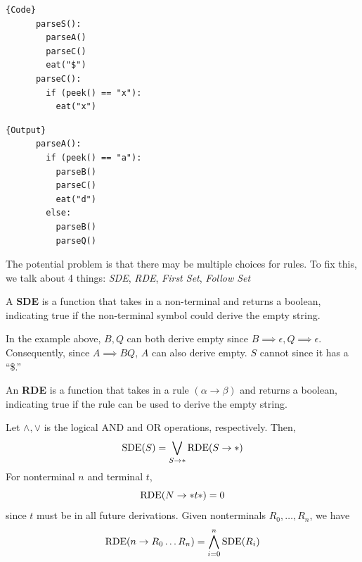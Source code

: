   \noindent\begin{minipage}{.5\textwidth}
    \begin{lstlisting}[]{Code}
      parseS(): 
        parseA() 
        parseC()
        eat("$")
      parseC(): 
        if (peek() == "x"): 
          eat("x")
    \end{lstlisting}
    \end{minipage}
    \hfill
    \begin{minipage}{.49\textwidth}
    \begin{lstlisting}[]{Output}
      parseA(): 
        if (peek() == "a"): 
          parseB() 
          parseC() 
          eat("d") 
        else: 
          parseB()
          parseQ()
    \end{lstlisting}
  \end{minipage}

  The potential problem is that there may be multiple choices for rules. To fix this, we talk about 4 things: \textit{SDE}, \textit{RDE}, \textit{First Set}, \textit{Follow Set}

  \begin{definition}
    \label{def:symbol-derives-empty}
    A \textbf{SDE} is a function that takes in a non-terminal and returns a boolean, indicating true if the non-terminal symbol could derive the empty string.  
  \end{definition}

  \begin{example}
    \label{ex:nullable-non-terminals}
    In the example above, $B, Q$ can both derive empty since $B \implies \epsilon, Q \implies \epsilon$. Consequently, since $A \implies BQ$, $A$ can also derive empty. $S$ cannot since it has a ``\$.''
  \end{example}

  \begin{definition}
    \label{def:rule-derives-empty}
    An \textbf{RDE} is a function that takes in a rule $(\alpha \to \beta)$ and returns a boolean, indicating true if the rule can be used to derive the empty string. 
  \end{definition}

  \begin{theorem}
    \label{thm:recursive-definition-of-sde-rde}
    Let $\wedge, \vee$ is the logical AND and OR operations, respectively. Then, 
    \begin{equation}
      \operatorname*{SDE}(S) = \bigvee_{S \to \ast} \operatorname*{RDE}(S \to \ast)
    \end{equation}
    For nonterminal $n$ and terminal $t$, 
    \begin{equation}
      \operatorname*{RDE}(N \to \ast t \ast) = 0
    \end{equation}
    since $t$ must be in all future derivations. Given nonterminals $R_0, \ldots, R_n$, we have 
    \begin{equation}
      \operatorname*{RDE}(n \to R_0 \ldots R_n) = \bigwedge_{i=0}^n \operatorname*{SDE}(R_i) 
    \end{equation}
  \end{theorem}

